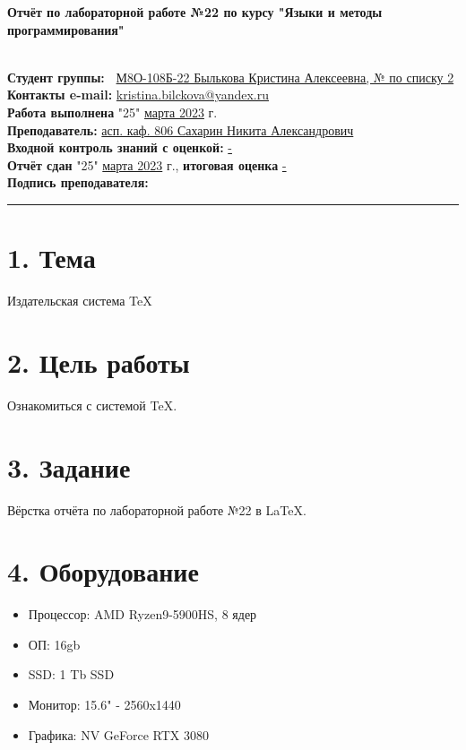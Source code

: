 \documentclass[a4paper]{report} %
\begin{document}
\noindent
\textbf{\Large Отчёт по лабораторной работе №22 по курсу "Языки и методы программирования"} \\

\hline
 
 \textbf{\\Студент группы:~} \underline{М8О-108Б-22 Былькова Кристина Алексеевна, № по списку 2} \\
\textbf{Контакты e-mail:} \href{mailto:kristina.bilckova@yandex.ru}{kristina.bilckova@yandex.ru} \\
\textbf{Работа выполнена} "25" \underline{марта 2023} г. \\
\textbf{Преподаватель:} \underline{асп. каф. 806 Сахарин Никита Александрович} \\
\textbf{Входной контроль знаний с оценкой:} \underline{-}\\
\textbf{Отчёт сдан} "25" \underline{марта 2023} г., \textbf{итоговая оценка} \underline{-} \\
\textbf{Подпись преподавателя:} \rule{60}{0.03}


\section*{1. Тема}
Издательская система TeX
\blindtext

\section*{2. Цель работы}
Ознакомиться с системой TeX.    
\blindtext

\section*{3. Задание}
Вёрстка отчёта по лабораторной работе №22 в LaTeX.
\blindtext

\section*{4. Оборудование}
\begin{itemize}
    \item Процессор: AMD Ryzen9-5900HS, 8 ядер
    \item ОП: 16gb
    \item SSD: 1 Tb SSD
    \item Монитор: 15.6" - 2560x1440
    \item Графика: NV GeForce RTX 3080
\end{itemize}
\end{document}
